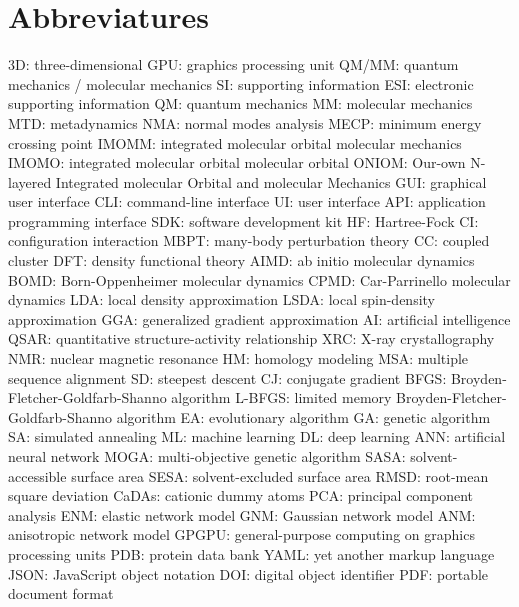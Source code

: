 \section{Abbreviatures}

3D: three-dimensional
GPU: graphics processing unit
QM/MM: quantum mechanics / molecular mechanics
SI: supporting information
ESI: electronic supporting information
QM: quantum mechanics
MM: molecular mechanics
MTD: metadynamics
NMA: normal modes analysis
MECP: minimum energy crossing point
IMOMM: integrated molecular orbital molecular mechanics
IMOMO: integrated molecular orbital molecular orbital
ONIOM: Our-own N-layered Integrated molecular Orbital and molecular Mechanics
GUI: graphical user interface
CLI: command-line interface
UI: user interface
API: application programming interface
SDK: software development kit
HF: Hartree-Fock
CI: configuration interaction
MBPT: many-body perturbation theory
CC: coupled cluster
DFT: density functional theory
AIMD: ab initio molecular dynamics
BOMD: Born-Oppenheimer molecular dynamics
CPMD: Car-Parrinello molecular dynamics
LDA: local density approximation
LSDA: local spin-density approximation
GGA: generalized gradient approximation
AI: artificial intelligence
QSAR: quantitative structure-activity relationship
XRC: X-ray crystallography
NMR: nuclear magnetic resonance
HM: homology modeling
MSA: multiple sequence alignment
SD: steepest descent
CJ: conjugate gradient
BFGS: Broyden-Fletcher-Goldfarb-Shanno algorithm
L-BFGS: limited memory Broyden-Fletcher-Goldfarb-Shanno algorithm
EA: evolutionary algorithm
GA: genetic algorithm
SA: simulated annealing
ML: machine learning
DL: deep learning
ANN: artificial neural network
MOGA: multi-objective genetic algorithm
SASA: solvent-accessible surface area
SESA: solvent-excluded surface area
RMSD: root-mean square deviation
CaDAs: cationic dummy atoms
PCA: principal component analysis
ENM: elastic network model
GNM: Gaussian network model
ANM: anisotropic network model
GPGPU: general-purpose computing on graphics processing units
PDB: protein data bank
YAML: yet another markup language
JSON: JavaScript object notation
DOI: digital object identifier
PDF: portable document format